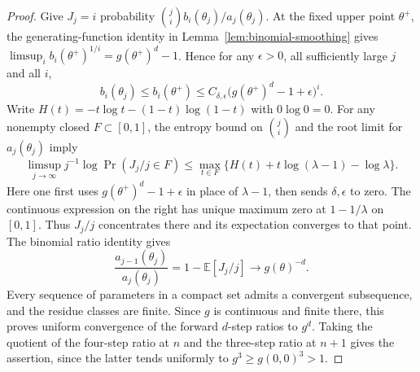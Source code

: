 \begin{proof}
Give \(J_j=i\) probability \(\binom ji b_i(\theta_j)/a_j(\theta_j)\).
At the fixed upper point \(\theta^+\), the generating-function
identity in Lemma~\ref{lem:binomial-smoothing} gives
\(\limsup_i b_i(\theta^+)^{1/i}=g(\theta^+)^d-1\).
Hence for any \(\epsilon>0\), all sufficiently large \(j\) and all \(i\),
\[
 b_i(\theta_j)\le b_i(\theta^+)
            \le C_{\delta,\epsilon}\bigl(g(\theta^+)^d-1+\epsilon\bigr)^i .
\]
Write \(H(t)=-t\log t-(1-t)\log(1-t)\) with \(0\log0=0\).
For any nonempty closed \(F\subset[0,1]\), the entropy bound on
\(\binom ji\) and the root limit for \(a_j(\theta_j)\) imply
\[
 \limsup_{j\to\infty}j^{-1}\log\Pr(J_j/j\in F)
 \le \max_{t\in F}\{H(t)+t\log(\lambda-1)-\log\lambda\}.
\]
Here one first uses \(g(\theta^+)^d-1+\epsilon\) in place of
\(\lambda-1\), then sends \(\delta,\epsilon\) to zero. The continuous
expression on the right has unique maximum zero at \(1-1/\lambda\) on
\([0,1]\). Thus \(J_j/j\) concentrates there and its expectation
converges to that point. The binomial ratio identity gives
\[
       \frac{a_{j-1}(\theta_j)}{a_j(\theta_j)}
                =1-\mathbb E[J_j/j]\longrightarrow g(\theta)^{-d}.
\]
Every sequence of parameters in a compact set admits a convergent
subsequence, and the residue classes are finite. Since \(g\) is
continuous and finite there, this proves uniform convergence of the
forward \(d\)-step ratios to \(g^d\). Taking the quotient of the
four-step ratio at \(n\) and the three-step ratio at \(n+1\) gives
the assertion, since the latter tends uniformly to \(g^3\ge g(0,0)^3>1\).
\end{proof}
